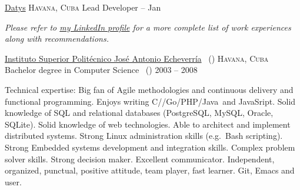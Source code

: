 \documentclass[10pt,a4paper]{article}
\begin{document}
\headedsection
  {\href{http://www.datys.cu}{Datys}}
  {\textsc{Havana, Cuba}} {%
  \headedsubsection
    {Lead Developer}
    { -- Jan }
    {}
}

\vspace{-0.2em}
\begin{center}
  \emph{\small Please refer to \href{http://www.linkedin.com/in/jvillasante}{my LinkedIn profile} for a more complete list of work experiences along with recommendations.}
\end{center}


\spacedhrule{-0.2em}{-0.4em}


\headedsection
  {\href{http://cujae.edu.cu}{Instituto Superior Polit\'ecnico Jos\'e Antonio Echeverr\'ia} \textnormal{~()}}
  {\textsc{Havana, Cuba}} {%
  \headedsubsection
    {Bachelor degree in Computer Science \textnormal{~()}}
    {2003 -- 2008}
    {}
}

\spacedhrule{0.5em}{-0.4em}


\inlineheadsection  %
  {Technical expertise:}
  {Big fan of Agile methodologies and continuous delivery and functional
    programming. Enjoys writing C/\nsp \CPP/\nsp Go/\nsp PHP/\nsp Java~and
    JavaSript. Solid knowledge of SQL and relational databases (PostgreSQL,
    MySQL, Oracle, SQLite). Solid knowledge of web technologies. Able to
    architect and implement distributed systems. Strong Linux administration
    skills (e.g.\ Bash scripting). Strong Embedded systems development and
    integration skills. Complex problem solver skills. Strong decision maker.
    Excellent communicator. Independent, organized, punctual, positive attitude,
    team player, fast learner. Git, Emacs and  user.}
\end{document}
